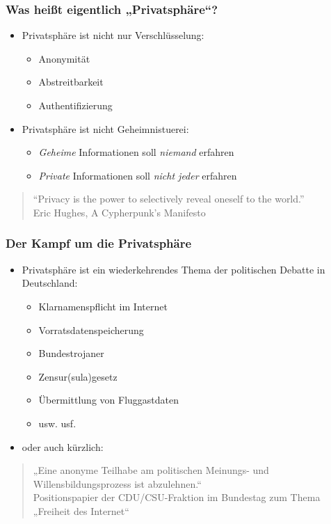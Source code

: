 \documentclass{beamer}
\begin{document}
\begin{frame}
\frametitle{Was heißt eigentlich „Privatsphäre“?}
	
	\begin{itemize}
		\item Privatsphäre ist nicht nur Verschlüsselung:
		\begin{itemize}
			\item Anonymität
			\item Abstreitbarkeit
			\item Authentifizierung
		\end{itemize}
\pause		\item Privatsphäre ist nicht Geheimnistuerei:
		\begin{itemize}
			\item \textit{Geheime} Informationen soll \textit{niemand} erfahren
			\item \textit{Private} Informationen soll \textit{nicht jeder} erfahren
		\end{itemize}
	\end{itemize}

	\begin{quote}
		“Privacy is the power to selectively reveal oneself to the world.”\\
		\textnormal{Eric Hughes, A Cypherpunk’s Manifesto}
	\end{quote}

\end{frame}

\begin{frame}
\frametitle{Der Kampf um die Privatsphäre}

	\begin{itemize}
		\item Privatsphäre ist ein wiederkehrendes Thema der politischen Debatte in Deutschland:
		\begin{itemize}
			\item Klarnamenspflicht im Internet
			\item Vorratsdatenspeicherung
			\item Bundestrojaner
			\item Zensur(sula)gesetz
			\item Übermittlung von Fluggastdaten
			\item usw. usf.
		\end{itemize}

\pause		\item oder auch kürzlich:
	\end{itemize}
	\begin{quote}
		„Eine anonyme Teilhabe am politischen Meinungs- und Willensbildungsprozess ist abzulehnen.“\\
		\textnormal{Positionspapier der CDU/CSU-Fraktion im Bundestag zum Thema „Freiheit des Internet“}
	\end{quote}
\end{frame}
\end{document}
